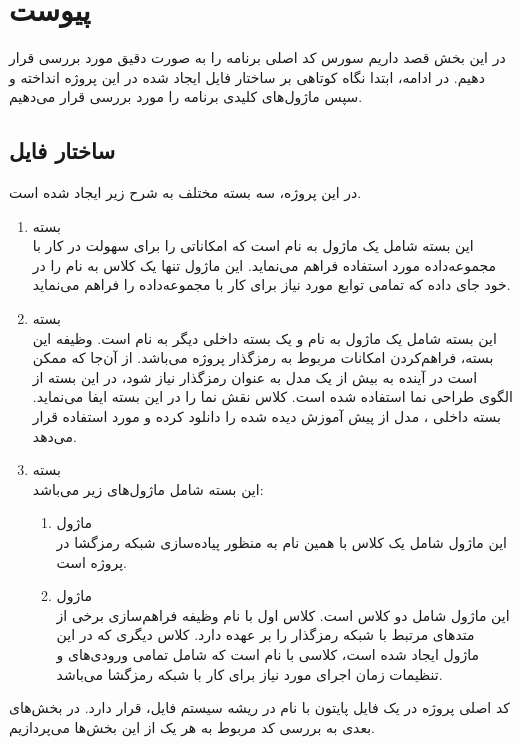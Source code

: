\chapter*{‌پیوست}
در این بخش قصد داریم سورس کد اصلی برنامه را به صورت دقیق مورد بررسی قرار دهیم. در ادامه، ابتدا نگاه کوتاهی بر ساختار فایل ایجاد شده در این پروژه انداخته و سپس ماژول‌های کلیدی برنامه را مورد بررسی قرار می‌دهیم.

\section*{ساختار فایل}
در این پروژه، سه بسته مختلف به شرح زیر ایجاد شده است.
\begin{enumerate}
	\item بسته  \\
	این بسته شامل یک ماژول به نام  است که امکاناتی را برای سهولت در کار با مجموعه‌‌داده مورد استفاده فراهم می‌نماید. این ماژول تنها یک کلاس به نام  را در خود جای داده که تمامی توابع مورد نیاز برای کار با مجموعه‌داده  را فراهم می‌نماید.
	\item بسته  \\
	این بسته شامل یک ماژول به نام  و یک بسته داخلی دیگر به نام  است. وظیفه این بسته، فراهم‌کردن امکانات مربوط به رمزگذار پروژه می‌باشد. از آن‌جا که ممکن است در آینده به بیش از یک مدل به عنوان رمزگذار نیاز شود، در این بسته از الگوی طراحی نما استفاده شده است. کلاس  نقش نما را در این بسته ایفا می‌نماید. بسته داخلی ، مدل از پیش آموزش دیده شده  را دانلود کرده و مورد استفاده قرار می‌دهد.
	\item بسته  \\
	این بسته شامل ماژول‌های زیر می‌باشد:
	\begin{enumerate}
		\item ماژول  \\
		این ماژول شامل یک کلاس با همین نام به منظور پیاده‌سازی شبکه رمزگشا در پروژه است. 
		\item ماژول  \\
		این ماژول شامل دو کلاس است. کلاس اول با نام  وظیفه فراهم‌سازی برخی از متد‌های مرتبط با شبکه رمزگذار را بر عهده دارد. کلاس دیگری که در این ماژول ایجاد شده است، کلاسی با نام  است که شامل تمامی ورودی‌های و تنظیمات زمان اجرای مورد نیاز برای کار با شبکه رمزگشا می‌باشد.
	\end{enumerate}
\end{enumerate}
کد اصلی پروژه در یک فایل پایتون با نام  در ریشه سیستم فایل، قرار دارد. در بخش‌های بعدی به بررسی کد مربوط به هر یک از این بخش‌ها می‌پردازیم.

